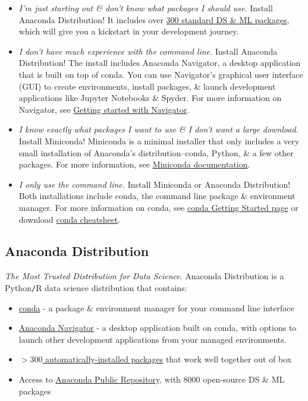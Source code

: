 \documentclass{article}
\begin{document}
\begin{itemize}
	\item {\it I'm just starting out \& don't know what packages I should use.} Install Anaconda Distribution! It includes over \href{https://docs.anaconda.com/anaconda/release-notes/}{300 standard DS \& ML packages}, which will give you a kickstart in your development journey.
	\item {\it I don't have much experience with the command line.} Install Anaconda Distribution! The install includes Anaconda Navigator, a desktop application that is built on top of conda. You can use Navigator's graphical user interface (GUI) to create environments, install packages, \& launch development applications like Jupyter Notebooks \& Spyder. For more information on Navigator, see \href{https://docs.anaconda.com/navigator/getting-started/}{Getting started with Navigator}.
	\item {\it I know exactly what packages I want to use \& I don't want a large download.} Install Miniconda! Miniconda is a minimal installer that only includes a very small installation of Anaconda's distribution--conda, Python, \& a few other packages. For more information, see \href{https://docs.anaconda.com/miniconda/}{Miniconda documentation}.
	\item {\it I only use the command line.} Install Miniconda or Anaconda Distribution! Both installations include conda, the command line package \& environment manager. For more information on conda, see \href{https://conda.io/projects/conda/en/latest/user-guide/getting-started.html}{conda Getting Started page} or download \href{https://docs.conda.io/projects/conda/en/latest/user-guide/cheatsheet.html}{conda cheatsheet}.
\end{itemize}

\subsection{Anaconda Distribution}
{\it The Most Trusted Distribution for Data Science}. Anaconda Distribution is a Python{\tt/}R data science distribution that contains:
\begin{itemize}
	\item \href{https://docs.conda.io/en/latest}{conda} - a package \& environment manager for your command line interface
	\item \href{https://docs.anaconda.com/navigator/}{Anaconda Navigator} - a desktop application built on conda, with options to launch other development applications from your managed environments.
	\item \href{https://docs.anaconda.com/anaconda/release-notes/}{$> 300$ automatically-installed packages} that work well together out of box
	\item Access to \href{https://repo.anaconda.com/pkgs/}{Anaconda Public Repository}, with 8000 open-source DS \& ML packages
\end{itemize}
\end{document}
